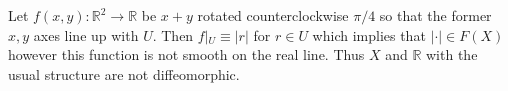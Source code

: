 \documentclass[10pt]{article}
\newcommand{\bb}[1]{\mathbb{#1}}
\theoremstyle{plain}
\theoremstyle{remark}
\begin{document}
Let $f(x,y):\bb{R}^2\rightarrow \bb{R}$ be $x+y$ rotated counterclockwise $\pi/4$ so that the former $x,y$ axes
line up with $U$. Then $f|_U\equiv |r|$ for $r\in U$ which implies that $|\cdot|\in F(X)$ however
this function is not smooth on the real line. Thus $X$ and $\bb{R}$ with the usual
structure are not diffeomorphic.


\end{document}
